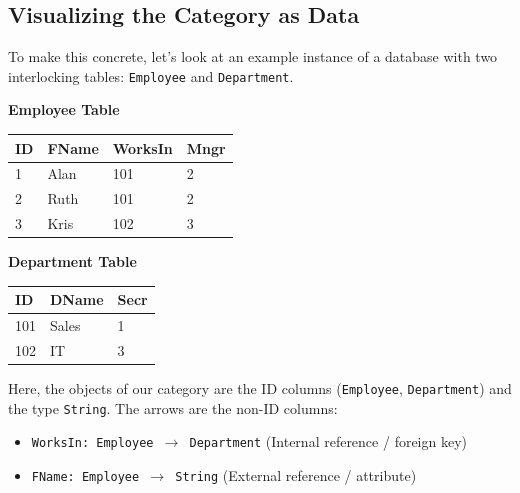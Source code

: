 \documentclass{article}
\begin{document}
\subsection{Visualizing the Category as Data}
To make this concrete, let's look at an example instance of a database with two interlocking tables: \texttt{Employee} and \texttt{Department}.

\vspace{0.5cm}
\begin{minipage}{0.55\textwidth}
    \centering
    \textbf{Employee Table} \\
    \vspace{0.2cm}
    \begin{tabular}{|l|l|l|l|}
    \hline
    \textbf{ID} & \textbf{FName} & \textbf{WorksIn} & \textbf{Mngr} \\ \hline
    1 & Alan & 101 & 2 \\ \hline
    2 & Ruth & 101 & 2 \\ \hline
    3 & Kris & 102 & 3 \\ \hline
    \end{tabular}
\end{minipage}
\begin{minipage}{0.4\textwidth}
    \centering
    \textbf{Department Table} \\
    \vspace{0.2cm}
    \begin{tabular}{|l|l|l|}
    \hline
    \textbf{ID} & \textbf{DName} & \textbf{Secr} \\ \hline
    101 & Sales & 1 \\ \hline
    102 & IT & 3 \\ \hline
    \end{tabular}
\end{minipage}
\vspace{0.5cm}

Here, the objects of our category are the ID columns (\texttt{Employee}, \texttt{Department}) and the type \texttt{String}. The arrows are the non-ID columns:
\begin{itemize}
    \item \texttt{WorksIn: Employee $\to$ Department} (Internal reference / foreign key)
    \item \texttt{FName: Employee $\to$ String} (External reference / attribute)
\end{itemize}
\end{document}
